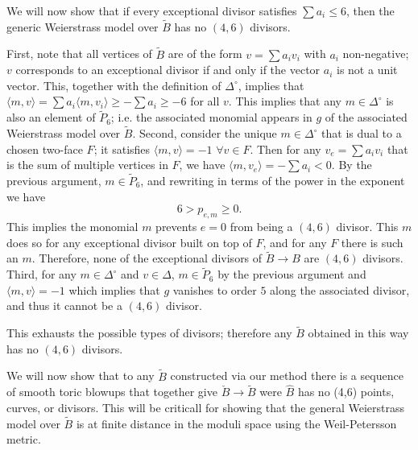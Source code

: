 \documentclass[aps,prl,twocolumn, superscriptaddress,groupedaddress,nofootinbib]{revtex4}
\newcommand{\vev}[1]{\langle #1 \rangle}
\begin{document}
\vspace{.5cm}
We will now show that if every exceptional divisor satisfies $\sum a_i \leq 6$, then the generic
Weierstrass model over $\tilde B$ has no $(4,6)$ divisors.

First, note that all vertices of $\tilde B$ are of the form $v=\sum a_i v_i$ with $a_i$ non-negative;
$v$ corresponds to an exceptional divisor if and only if the vector $a_i$ is not a unit vector. This,
together with the definition of $\Delta^\circ$, implies that $\vev{m,v}=\sum a_i \vev{m,v_i} \geq -\sum a_i \geq -6$ for all $v$. This implies that any $m\in \Delta^\circ$ is also an element of $\tilde P_6$; i.e. the associated monomial appears in $g$ of the associated Weierstrass model over $\tilde B$.
Second, consider the unique $m\in \Delta^\circ$ that is dual to a chosen two-face $F$; it satisfies
$\vev{m,v}=-1\,\, \forall v\in F.$ Then for any $v_e=\sum a_i v_i$ that is the sum of multiple vertices in $F$, we have
$\vev{m,v_e}=-\sum a_i < 0$. By the previous argument, $m\in \tilde P_6$, and
rewriting in terms of the power in the exponent we have
\begin{equation}
6 > p_{e,m} \geq 0.
\end{equation}
This implies the monomial $m$ prevents $e=0$ from being a $(4,6)$ divisor. This $m$ does so for
any exceptional divisor built on top of $F$, and for any $F$ there is such an $m$. Therefore, none
of the exceptional divisors of $\tilde B \to B$ are $(4,6)$ divisors.
Third, for any $m\in \Delta^\circ$ and $v \in \Delta$, $m\in \tilde P_6$ by the previous argument
and $\vev{m,v} =-1$ which implies that $g$ vanishes to order $5$ along the associated divisor, and thus it cannot be a $(4,6)$ divisor.

This exhausts the possible types of divisors; therefore any $\tilde B$ obtained in 
this way has no $(4,6)$ divisors.

\vspace{.5cm}
We will now show that to any $\tilde B$ constructed via our method
there is a sequence of smooth toric blowups that together give
$\check B\to \tilde B$ were $\hat B$ has no (4,6) points, curves, or 
divisors. This will be criticall for showing that the general Weierstrass
model over $\tilde B$ is at finite distance in the moduli space
using the Weil-Petersson metric.
\end{document}

